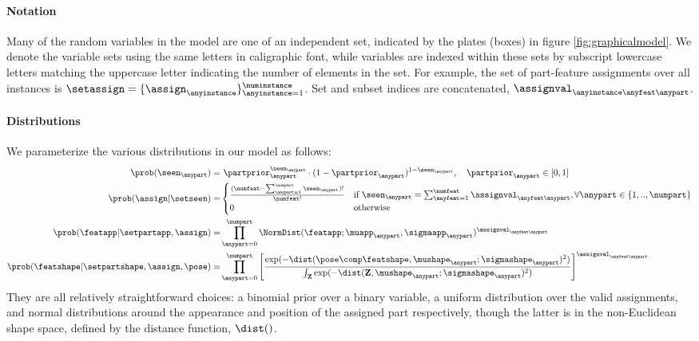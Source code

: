 \paragraph{Notation}
Many of the random variables in the model are one of an independent set, indicated by the plates (boxes) in figure \ref{fig:graphicalmodel}. We denote the variable sets using the same letters in caligraphic font, while variables are indexed within these sets by subscript lowercase letters matching the uppercase letter indicating the number of elements in the set. For example, the set of part-feature assignments over all instances is $\setassign = \{\assign_{\anyinstance}\}_{\anyinstance=1}^\numinstance$. Set and subset indices are concatenated, \eg $\assignval_{\anyinstance\anyfeat\anypart}$.

\paragraph{Distributions}
We parameterize the various distributions in our model as follows:
\begin{align}
\prob(\seen_{\anypart}) = & ~\partprior_\anypart^{\seen_{\anypart}}\cdot(1-\partprior_\anypart)^{1-\seen_{\anypart}}, ~~~\partprior_\anypart\in[0, 1] \label{eqn:Ddist}\\
\prob(\assign|\setseen) = & \begin{cases} \frac{(\numfeat - \sum_{\anypart=1}^{\numpart}\seen_\anypart)!}{\numfeat!} & \mbox{if}~ \seen_\anypart = \sum_{\anyfeat=1}^{\numfeat}\assignval_{\anyfeat\anypart}, \forall\anypart\in\{1,..,\numpart\} \\ 0 & \mbox{otherwise} \end{cases}\label{eqn:HDdist}\\
\prob(\featapp|\setpartapp,\assign) = & \prod_{\anypart=0}^\numpart
\NormDist(\featapp; \muapp_\anypart, \sigmaapp_\anypart)^{\assignval_{\anyfeat\anypart}}
\label{eqn:appearance}\\
\prob(\featshape|\setpartshape,\assign,\pose) = & \prod_{\anypart=0}^\numpart
\left[\frac{\textstyle\exp(-\dist(\pose\comp\featshape, \mushape_\anypart; \sigmashape_\anypart)^2)}{\int_\mathbf{Z} \exp(-\dist(\mathbf{Z}, \mushape_\anypart; \sigmashape_\anypart)^2)}\right]^{\assignval_{\anyfeat\anypart}}\label{eqn:shape}
\end{align}
They are all relatively straightforward choices: a binomial prior over a binary variable, a uniform distribution over the valid assignments, and normal distributions around the appearance and position of the assigned part respectively, though the latter is in the non-Euclidean shape space, defined by the distance function, $\dist()$. 

